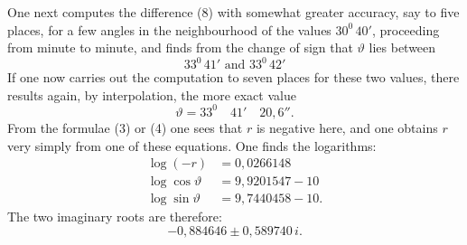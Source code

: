 
One next computes the difference (8) with somewhat greater accuracy, say to five places, for a few angles in the neighbourhood of the values $30^0\,40'$, proceeding from minute to minute, and finds from the change of sign that $\vartheta$ lies between
\[
33^0\,41' \text{ and } 33^0\,42'
\]
If one now carries out the computation to seven places for these two values, there results again, by interpolation, the more exact value
\[
\vartheta = 33^0 \quad 41' \quad 20{,}6''.
\]
From the formulae (3) or (4) one sees that $r$ is negative here, and one obtains $r$ very simply from one of these equations. One finds the  logarithms:
\[
\begin{aligned}
\log(-r) &= 0{,}0266148\\
\log\cos\vartheta &= 9{,}9201547 - 10\\
\log\sin\vartheta &= 9{,}7440458 - 10.
\end{aligned}
\]
The two imaginary roots are therefore:
\[
-0{,}884646 \pm 0{,}589740\,i.
\]
